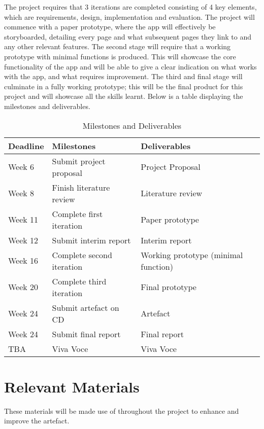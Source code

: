 \documentclass{article}
\begin{document}
The project requires that 3 iterations are completed consisting of 4 key elements, which are requirements, design, implementation and evaluation. The project will commence with a paper prototype, where the app will effectively be storyboarded, detailing every page and what subsequent pages they link to and any other relevant features.
The second stage will require that a working prototype with minimal functions is produced. This will showcase the core functionality of the app and will be able to give a clear indication on what works with the app, and what requires improvement.
The third and final stage will culminate in a fully working prototype; this will be the final product for this project and will showcase all the skills learnt.
Below is a table displaying the milestones and deliverables.

\begin{figure}[H]
\centering
\end{figure}

\begin{table}[H]
	\centering
	\begin{tabular}{| l | l | l |}
\hline
Deadline & 	Milestones & 				Deliverables \\
\hline
Week 6   & 	Submit project proposal &		Project Proposal \\
Week 8 &		Finish literature review &		Literature review \\
Week 11 &	Complete first iteration &		Paper prototype \\
Week 12 &	Submit interim report &		Interim report \\
Week 16 &	Complete second iteration & 	Working prototype (minimal function) \\
Week 20 &	Complete third iteration &		Final prototype \\
Week 24 &	Submit artefact on CD & 		Artefact \\
Week 24 &	Submit final report &			Final report \\
TBA &  		Viva Voce &				Viva Voce \\
\hline

	\end{tabular}
\caption{Milestones and Deliverables}
\end{table}

\section{Relevant Materials}

These materials will be made use of throughout the project to enhance and improve the artefact.
\end{document}
